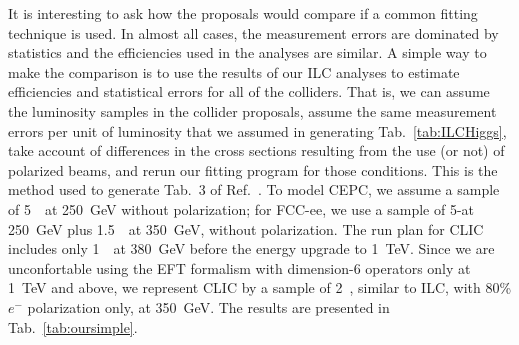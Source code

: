 It is interesting to ask how the proposals would compare if a common
fitting technique is used. In almost all cases, the measurement errors
are dominated by statistics and the efficiencies used in the analyses
are similar.  A simple way to make the comparison is  to use
the results of our ILC analyses to estimate efficiencies and
statistical errors for all of the colliders.  That is, we can  assume
the luminosity samples in the collider proposals, assume the same
measurement errors per unit of luminosity that we assumed in
generating Tab.~\ref{tab:ILCHiggs},  take account of differences in
the cross sections resulting from the use (or not) of polarized beams,
and rerun our fitting  program for those conditions.   This is the
method used to generate 
Tab.~3 of Ref.~\cite{Barklow:2017suo}.  To model CEPC, we assume
 a sample of  5~\iab\ at 250~GeV without polarization; for 
FCC-ee, we use a sample of 5-\iab at 250~GeV plus 1.5~\iab\ at 350~GeV,
without polarization.  The run plan for CLIC includes only 1~\iab\ at
380~GeV before the energy upgrade to 1~TeV.  Since we are
unconfortable using the EFT formalism
 with dimension-6 operators only at 1~TeV and above, we represent CLIC by a sample of
2~\iab, similar to ILC, with 80\% $e^-$ polarization only, at 350~GeV.  
The results are presented in Tab.~\ref{tab:oursimple}.  


